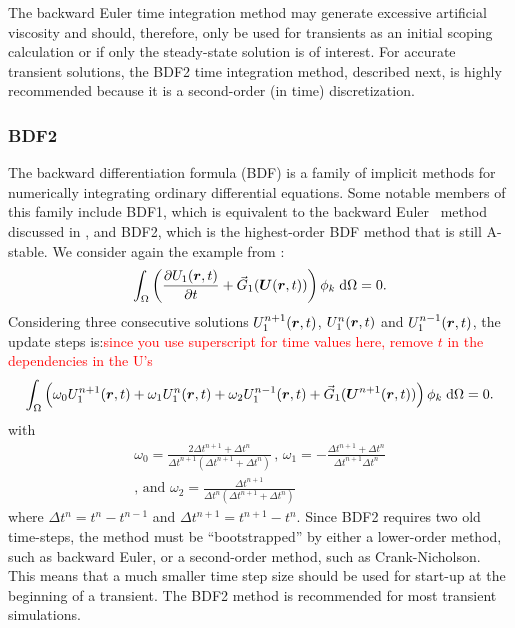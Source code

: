 The backward Euler time integration method may generate excessive artificial
viscosity and should, therefore, only be used for transients
as an initial scoping calculation or if only the steady-state solution is of
interest. For accurate transient solutions, the BDF2 time
integration method, described next, is highly recommended because it is
a second-order (in time) discretization.
%
\subsubsection{BDF2\label{sec:bdf2}}
%
The backward differentiation formula (BDF) is a family of implicit
methods for numerically integrating ordinary differential equations.
Some notable members of this family include BDF1, which is equivalent
to the backward Euler~\cite{Ascher_1998} method discussed in
, and BDF2, which is the highest-order
BDF method that is still A-stable. We consider again the example from : 
\begin{align}
  \int_{\Omega} \left(\frac{\partial U_1(\boldsymbol r,t)}{\partial t} + \vec{G}_1(\boldsymbol U(\boldsymbol r,t)) \right) \phi_k \; \text{d}{\Omega} = 0.
\end{align}
Considering three consecutive solutions $U_1^{n+1}(\boldsymbol r,t)$, $U_1^n(\boldsymbol r,t)$ and $U_1^{n-1}(\boldsymbol r,t)$, the update steps is:\textcolor{red}{since you use superscript for time values here, remove $t$ in the dependencies in the U's}
%
\begin{align}
\label{eqn:bdf2}
  \int_{\Omega} \left(\omega_0 U_1^{n+1}(\boldsymbol r,t)+\omega_1 U_1^{n}(\boldsymbol r,t)+\omega_2 U_1^{n-1}(\boldsymbol r,t) + \vec{G}_1(\boldsymbol U^{n+1}(\boldsymbol r,t)) \right) \phi_k \; \text{d}{\Omega} = 0.
\end{align}
%
with
%
\begin{multline}
\omega_0 =\frac{2\Delta t^{n+1}+\Delta t^n}{\Delta t^{n+1} \left( \Delta t^{n+1}+\Delta t^n \right)} \,,\,
\omega_1 = -\frac{\Delta t^{n+1}+\Delta t^n}{\Delta t^{n+1} \Delta t^n}  \\
\text{, and } \omega_2 = \frac{\Delta t^{n+1}}{\Delta t^n \left( \Delta t^{n+1} + \Delta t^n \right)} \nonumber
\end{multline}
%
where $\Delta t^{n} = t^n-t^{n-1}$ and $\Delta t^{n+1} = t^{n+1}-t^{n}$.
Since BDF2 requires two old time-steps, the method must be
``bootstrapped'' by either a lower-order method, such as backward Euler, or a second-order method, such as Crank-Nicholson.  This means that a much smaller time step size should be used
for start-up at the beginning of a transient.  The BDF2 method is 
recommended for most transient simulations.
%
